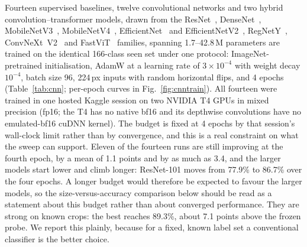 \documentclass[a4paper,fleqn]{cas-dc}
\begin{document}
Fourteen supervised baselines, twelve convolutional networks and two hybrid
convolution--transformer models, drawn from the ResNet~\citep{he2016},
DenseNet~\citep{huang2017densenet}, MobileNetV3~\citep{howard2019},
MobileNetV4~\citep{qin2024}, EfficientNet~\citep{tan2019efficientnet} and
EfficientNetV2~\citep{tan2021efficientnetv2}, RegNetY~\citep{radosavovic2020regnet},
ConvNeXt~V2~\citep{woo2023convnextv2} and FastViT~\citep{vasu2023fastvit} families,
spanning 1.7--42.8\,M parameters are trained on the identical
166-class seen set under one protocol: ImageNet-pretrained initialisation, AdamW at a learning rate
of $3\times10^{-4}$ with weight decay $10^{-4}$, batch size 96, 224\,px inputs with random horizontal
flips, and 4 epochs (Table~\ref{tab:cnn}; per-epoch curves in Fig.~\ref{fig:cnntrain}). %
All fourteen were trained in one hosted Kaggle session on two NVIDIA T4 GPUs in mixed
precision (fp16; the T4 has no native bf16 and its depthwise convolutions have no emulated-bf16
cuDNN kernel). The budget is fixed at 4 epochs by that session's wall-clock limit rather than by
convergence, and this is a real constraint on what the sweep can support. Eleven of the fourteen runs are still improving at the
fourth epoch, by a mean of 1.1 points and by as much as 3.4, and the larger models start lower and
climb longer: ResNet-101 moves from 77.9\% to 86.7\% over the four epochs. A longer budget
would therefore be expected to favour the larger models, so the size-versus-accuracy comparison
below should be read as a statement about this budget rather than about converged performance. They are strong on known crops: the best reaches 89.3\%, about 7.1 points above the frozen
probe. We report this plainly, because for a fixed, known label set a
conventional classifier is the better choice.
\end{document}

